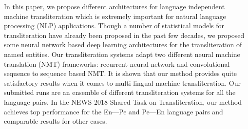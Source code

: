 In this paper, we propose different architectures for language independent machine transliteration which is extremely important for natural language processing (NLP) applications. Though a number of statistical models for transliteration have already been proposed in the past few decades, we proposed some neural network based deep learning architectures for the transliteration of named entities. Our transliteration systems adapt two different neural machine translation (NMT) frameworks: recurrent neural network and convolutional sequence to sequence based NMT. It is shown that our method provides quite satisfactory results when it comes to multi lingual machine transliteration. Our submitted runs are an ensemble of different transliteration systems for all the language pairs. In the NEWS 2018 Shared Task on Transliteration, our method achieves top performance for the En---Pe and Pe---En language pairs and comparable results for other cases.

